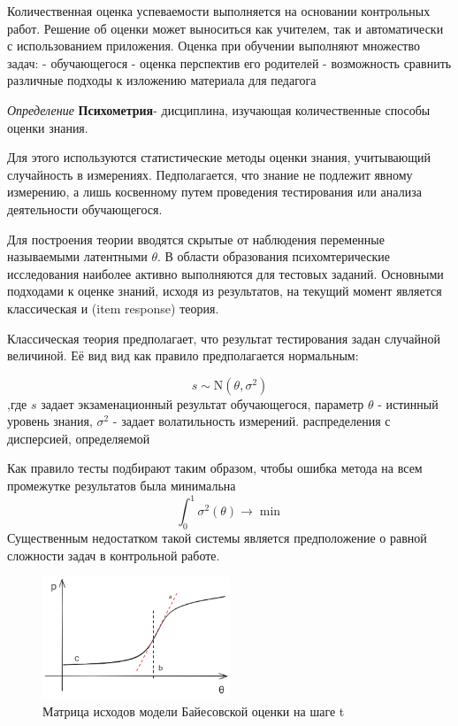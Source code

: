 
Количественная оценка успеваемости выполняется на основании контрольных работ. Решение об оценки может выноситься как учителем, так и автоматически с использованием приложения. Оценка при обучении выполняют множество задач:
- обучающегося
- оценка перспектив его родителей
- возможность сравнить различные подходы к изложению материала для педагога 


\textit{Определение} \textbf{Психометрия}- дисциплина, изучающая количественные способы оценки знания.

Для этого используются статистические методы оценки знания, учитывающий случайность в измерениях.
Педполагается, что знание не подлежит явному измерению,
а лишь косвенному путем проведения тестирования или анализа деятельности обучающегося.


Для построения теории вводятся скрытые от наблюдения переменные называемыми латентными $\theta$.
В области образования психомтерические исследования наиболее активно выполняются для тестовых заданий. 
Основными подходами к оценке знаний, исходя из результатов, 
на текущий момент является классическая и (item response) теория.

Классическая теория предполагает, что результат тестирования задан случайной величиной. Её вид вид как правило предполагается нормальным:

\begin{equation}
    s \sim \mathrm{N}(\theta,\sigma^2)  
\end{equation}
,где $s$ задает экзаменационный результат обучающегося, параметр $\theta$ - истинный уровень знания, $\sigma^2$ - задает волатильность измерений. распределения с дисперсией, определяемой 

Как правило тесты подбирают таким образом, чтобы ошибка метода на всем промежутке результатов была минимальна
$$
    \int_0^1 \sigma^2(\theta) \rightarrow \min
$$
Существенным недостатком такой системы является предположение о равной сложности задач в контрольной работе.


\begin{figure}[h]
    \centering
    \includegraphics[width=0.5\textwidth]{assets/pedagogic/social/irt.excalidraw.png}
    \caption{Матрица исходов модели Байесовской оценки на шаге t}
    \label{irt_function}
\end{figure}

